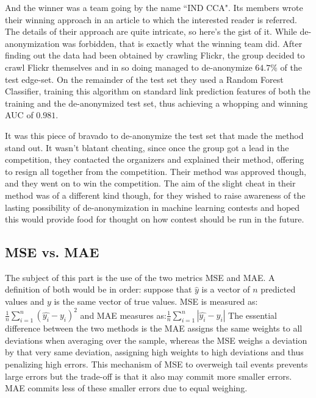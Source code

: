\documentclass{llncs}
\begin{document}
And the winner was a team going by the name ``IND CCA". Its members wrote their winning approach in an article \cite{6033446} to which the interested reader is referred. The details of their approach are quite intricate, so here's the gist of it. While de-anonymization was forbidden, that is exactly what the winning team did. After finding out the data had been obtained by crawling Flickr, the group decided to crawl Flickr themselves and in so doing managed to de-anonymize $64.7 \%$ of the test edge-set. On the remainder of the test set they used a Random Forest Classifier, training this algorithm on standard link prediction features of both the training and the de-anonymized test set, thus achieving a whopping and winning AUC of $0.981$.

It was this piece of bravado to de-anonymize the test set that made the method stand out. It wasn't blatant cheating, since once the group got a lead in the competition, they contacted the organizers and explained their method, offering to resign all together from the competition. Their method was approved though, and they went on to win the competition. The aim of the slight cheat in their method was of a different kind though, for they wished to raise awareness of the lasting possibility of de-anonymization in machine learning contests and hoped this would provide food for thought on how contest should be run in the future.

\subsection{MSE vs. MAE}
The subject of this part is the use of the two metrics MSE and MAE. A definition of both would be in order: suppose that $\hat{y}$ is a vector of $n$ predicted values and $y$ is the same vector of true values. MSE is measured as: $\frac{1}{n}\sum_{i=1}^{n}(\hat{y_{i}} - y_{i})^{2}$  
and MAE measures as:$\frac{1}{n}\sum_{i=1}^{n}|\hat{y_{i}}-y_{i}|$
The essential difference between the two methods is the MAE assigns the same weights to all deviations when averaging over the sample, whereas the MSE weighs a deviation by that very same deviation, assigning high weights to high deviations and thus penalizing high errors. This mechanism of MSE to overweigh tail events prevents large errors but the trade-off is that it also may commit more smaller errors. MAE commits less of these smaller errors due to equal weighing.
\end{document}
